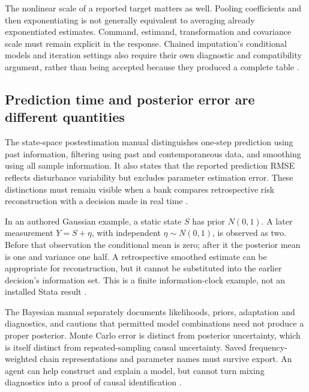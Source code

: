 The nonlinear scale of a reported target matters as well. Pooling
coefficients and then exponentiating is not generally equivalent to
averaging already exponentiated estimates. Command, estimand, transformation
and covariance scale must remain explicit in the response. Chained
imputation's conditional models and iteration settings also require their
own diagnostic and compatibility argument, rather than being accepted
because they produced a complete table
\cite{exec21_transport_stata_estimate,exec21_transport_stata_chained,
exec24_stata_choice}.

\subsection{Prediction time and posterior error are different quantities}
The state-space postestimation manual distinguishes one-step prediction
using past information, filtering using past and contemporaneous data, and
smoothing using all sample information. It also states that the reported
prediction RMSE reflects disturbance variability but excludes parameter
estimation error. These distinctions must remain visible when a bank
compares retrospective risk reconstruction with a decision made in real
time \cite{exec22_state_stata_sspace_post}.

In an authored Gaussian example, a static state $S$ has prior $N(0,1)$.
A later measurement $Y=S+\eta$, with independent $\eta\sim N(0,1)$, is
observed as two. Before that observation the conditional mean is zero;
after it the posterior mean is one and variance one half. A retrospective
smoothed estimate can be appropriate for reconstruction, but it cannot
be substituted into the earlier decision's information set. This is a
finite information-clock example, not an installed Stata result
\cite{exec24_stata_choice}.

The Bayesian manual separately documents likelihoods, priors, adaptation
and diagnostics, and cautions that permitted model combinations need not
produce a proper posterior. Monte Carlo error is distinct from posterior
uncertainty, which is itself distinct from repeated-sampling causal
uncertainty. Saved frequency-weighted chain representations and parameter
names must survive export. An agent can help construct and explain a model,
but cannot turn mixing diagnostics into a proof of causal identification
\cite{exec22_state_stata_bayesmh,exec24_stata_choice}.

